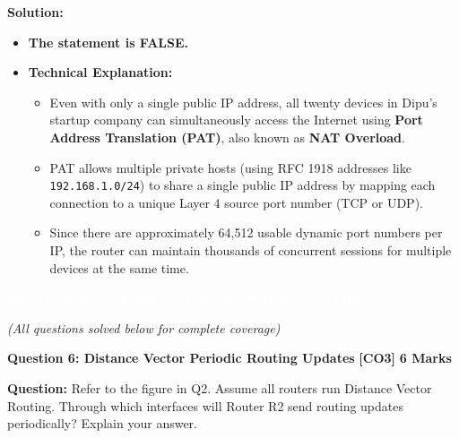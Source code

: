 \documentclass[11pt,a4paper]{article}
\newcommand{\questionheader}[3]{
    \vspace{0.35cm}
    \noindent\colorbox{qboxbg}{
        \parbox{\dimexpr\textwidth-2\fboxsep\relax}{
            \textbf{\textcolor{primary}{\large #1}} \hfill \textbf{\textcolor{accent}{[#2]}} \hfill \textbf{\textcolor{secondary}{#3 Marks}}
        }
    }
    \vspace{0.15cm}
}
\newcommand{\sectionbanner}[1]{
    \vspace{0.5cm}
    \noindent\colorbox{primary}{
        \parbox{\dimexpr\textwidth-2\fboxsep\relax}{
            \centering \textbf{\textcolor{white}{\Large #1}}
        }
    }
    \vspace{0.25cm}
}
\begin{document}
\textbf{Solution:}
\begin{itemize}
    \item \textbf{The statement is FALSE.}
    \item \textbf{Technical Explanation:}
    \begin{itemize}
        \item Even with only a single public IP address, all twenty devices in Dipu's startup company can simultaneously access the Internet using \textbf{Port Address Translation (PAT)}, also known as \textbf{NAT Overload}.
        \item PAT allows multiple private hosts (using RFC 1918 addresses like \texttt{192.168.1.0/24}) to share a single public IP address by mapping each connection to a unique Layer 4 source port number (TCP or UDP).
        \item Since there are approximately 64,512 usable dynamic port numbers per IP, the router can maintain thousands of concurrent sessions for multiple devices at the same time.
    \end{itemize}
\end{itemize}

\newpage
\sectionbanner{SECTION B: ANY TWO OUT OF THREE (12 MARKS)}
\textit{(All questions solved below for complete coverage)}

\questionheader{Question 6: Distance Vector Periodic Routing Updates}{CO3}{6}

\textbf{Question:} Refer to the figure in Q2. Assume all routers run Distance Vector Routing. Through which interfaces will Router R2 send routing updates periodically? Explain your answer.
\end{document}
